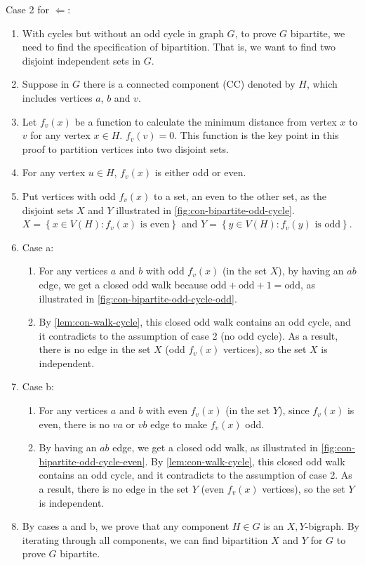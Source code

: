 \documentclass[../src/handouts/main.tex]{subfiles}
\begin{document}
Case 2 for $\Leftarrow$:
\begin{enumerate}
  \item With cycles but without an odd cycle in graph $G$, to prove $G$ bipartite, we need to find the specification of bipartition. That is, we want to find two disjoint independent sets in $G$.
  \item Suppose in $G$ there is a connected component (CC) denoted by $H$, which includes vertices $a$, $b$ and $v$.
  \item Let $f_v(x)$ be a function to calculate the minimum distance from vertex $x$ to $v$ for any vertex $x \in H$. $f_v(v) = 0$. This function is the key point in this proof to partition vertices into two disjoint sets.
  \item For any vertex $u \in H$, $f_v(x)$ is either odd or even.
  \item Put vertices with odd $f_v(x)$ to a set, an even to the other set, as the disjoint sets $X$ and $Y$ illustrated in \cref{fig:con-bipartite-odd-cycle}. $X = \left\{x \in V(H): f_v(x) \text{ is even} \right\}$ and $Y = \left\{y \in V(H): f_v(y) \text{ is odd} \right\}$.
  \item Case a:
    \begin{enumerate}
      \item For any vertices $a$ and $b$ with odd $f_v(x)$ (in the set $X$), by having an $ab$ edge, we get a closed odd walk because $\text{odd} + \text{odd} + 1 = \text{odd}$, as illustrated in \cref{fig:con-bipartite-odd-cycle-odd}.
      \item By \cref{lem:con-walk-cycle}, this closed odd walk contains an odd cycle, and it contradicts to the assumption of case 2 (no odd cycle). As a result, there is no edge in the set $X$ (odd $f_v(x)$ vertices), so the set $X$ is independent.
    \end{enumerate}

  \item Case b:
    \begin{enumerate}
      \item For any vertices $a$ and $b$ with even $f_v(x)$ (in the set $Y$), since $f_v(x)$ is even, there is no $va$ or $vb$ edge to make $f_v(x)$ odd.
      \item By having an $ab$ edge, we get a closed odd walk, as illustrated in \cref{fig:con-bipartite-odd-cycle-even}. By \cref{lem:con-walk-cycle}, this closed odd walk contains an odd cycle, and it contradicts to the assumption of case 2. As a result, there is no edge in the set $Y$ (even $f_v(x)$ vertices), so the set $Y$ is independent.
    \end{enumerate}

  \item By cases a and b, we prove that any component $H \in G$ is an $X,Y$-bigraph. By iterating through all components, we can find bipartition $X$ and $Y$ for $G$ to prove $G$ bipartite.
\end{enumerate}
\end{document}
